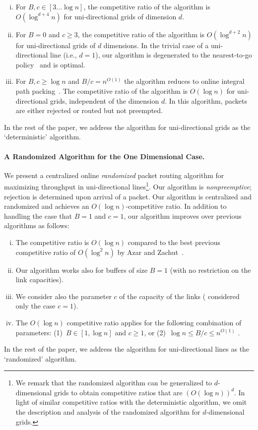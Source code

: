 \documentclass[11pt]{article}
\newenvironment{proof sketch}[1]{\noindent {\emph{Proof sketch of #1:}}}{\hfill \qed}
\begin{document}
\begin{enumerate}[(i)]
\item For $B,c\in [3 \ldots \log n]$, the competitive
    ratio of the algorithm is $O(\log ^{d+4} n)$ for
    uni-directional grids of dimension $d$.
\item For $B=0$ and $c\geq 3$, the competitive ratio of
    the algorithm is $O(\log ^{d+2} n)$ for
    uni-directional grids of $d$ dimensions. In the
    trivial case of a uni-directional line (i.e., $d=1$),
    our algorithm is degenerated to the nearest-to-go
    policy~\cite{AKOR} and is optimal.
\item For $B,c \geq \log n$ and $B/c=n^{O(1)}$ the
    algorithm reduces to online integral path
    packing~\cite{BN06,AAP}. The competitive ratio of the
    algorithm is $O(\log n)$ for uni-directional grids,
    independent of the dimension $d$. In this algorithm,
    packets are either rejected or routed but not
    preempted.
\end{enumerate}
In the rest of the paper, we address the algorithm for
uni-directional grids as the `deterministic' algorithm.

\paragraph{A Randomized Algorithm for the One Dimensional Case.}
We present a centralized online \emph{randomized} packet
routing algorithm for maximizing throughput in
uni-directional lines\footnote{We remark that the
randomized
  algorithm can be generalized to $d$-dimensional grids to obtain competitive ratios
  that are $(O(\log n))^d$. In light of similar competitive ratios with the
  deterministic algorithm, we omit the description and analysis of the randomized
  algorithm for $d$-dimensional grids.}. Our algorithm is \emph{nonpreemptive};
rejection is determined upon arrival of a packet. Our algorithm is centralized and
randomized and achieves an $O(\log n)$-competitive ratio. In addition to handling the
case that $B=1$ and $c=1$, our algorithm improves over previous algorithms as
follows:
\begin{enumerate}[(i)]
\item The competitive ratio is $O(\log n)$ compared to the best  previous competitive ratio of $O(\log^2 n)$ by Azar and Zachut~\cite{AZ}.
\item Our algorithm works also for buffers of size $B = 1$ (with no restriction on
  the link capacities).
\item We consider also the parameter $c$ of the capacity of the links (\cite{AZ,AKK} considered only the case $c=1$).
\item The $O(\log n)$ competitive ratio applies for the following combination of parameters:
  (1)~$B\in [1,\log n]$ and $c\geq 1$, or (2)~$\log n\leq
  B/c\leq n^{O(1)}$ .
\end{enumerate}
In the rest of the paper, we address the algorithm for
uni-directional lines as the `randomized' algorithm.
\end{document}
